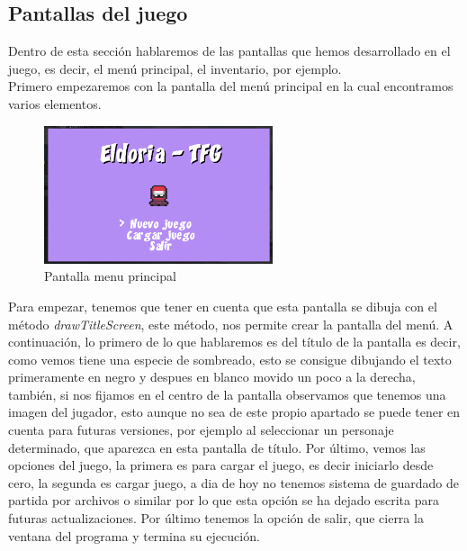 \documentclass[a4paper]{article}
\begin{document}
\subsection{Pantallas del juego}
Dentro de esta sección hablaremos de las pantallas que hemos desarrollado en el juego, es decir, el menú principal, el inventario, por ejemplo.\\
Primero empezaremos con la pantalla del menú principal en la cual encontramos varios elementos.\\
\begin{figure}[!ht]
    \centering
    \includegraphics[width=0.6\textwidth]{Images/pantalla1tfg.png}
    \caption{Pantalla menu principal}
    \label{fig:pantalla1}
\end{figure}
Para empezar, tenemos que tener en cuenta que esta pantalla se dibuja con el método \textit{drawTitleScreen}, este método, nos permite crear la pantalla del menú. A continuación, lo primero de lo que hablaremos es del título de la pantalla
es decir, como vemos tiene una especie de sombreado, esto se consigue dibujando el texto primeramente en negro y despues en blanco movido un poco a la derecha, también, si nos fijamos en el centro de la pantalla observamos que tenemos una imagen del jugador,
esto aunque no sea de este propio apartado se puede tener en cuenta para futuras versiones, por ejemplo al seleccionar un personaje determinado, que aparezca en esta pantalla de título. Por último, vemos las opciones del juego, la primera es para cargar el juego, es decir
iniciarlo desde cero, la segunda es cargar juego, a dia de hoy no tenemos sistema de guardado de partida por archivos o similar por lo que esta opción se ha dejado escrita para futuras actualizaciones. Por último tenemos la opción de salir, que cierra la ventana del programa y termina su ejecución.\\
\end{document}
